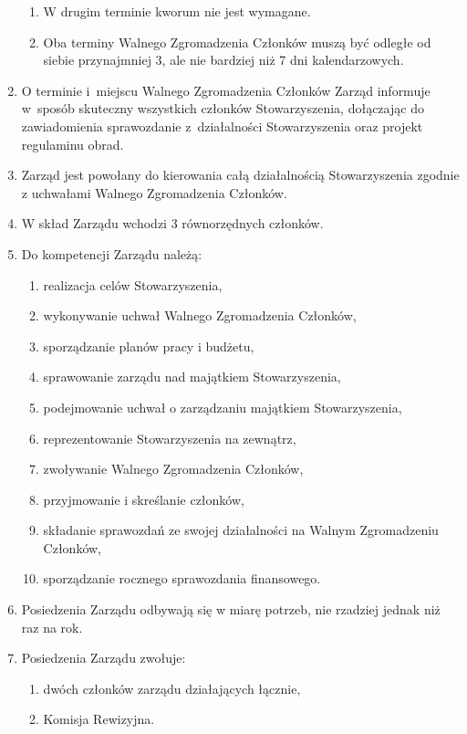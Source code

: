\documentclass{article}
\begin{document}
\begin{enumerate}
\begin{enumerate}
        \item W drugim terminie kworum nie jest wymagane.
        \item Oba terminy Walnego Zgromadzenia Członków muszą być odległe od siebie przynajmniej 3, ale nie bardziej niż 7 dni kalendarzowych.
      \end{enumerate}
    \item O terminie i~miejscu Walnego Zgromadzenia Członków Zarząd informuje w~sposób skuteczny wszystkich członków Stowarzyszenia, dołączając do zawiadomienia sprawozdanie z~działalności Stowarzyszenia oraz projekt regulaminu obrad.
    \item Zarząd jest powołany do kierowania całą działalnością Stowarzyszenia zgodnie z uchwałami Walnego Zgromadzenia Członków.
    \item W skład Zarządu wchodzi 3 równorzędnych członków.
    \item Do kompetencji Zarządu należą:
      \begin{enumerate}
        \item realizacja celów Stowarzyszenia,
        \item wykonywanie uchwał Walnego Zgromadzenia Członków,
        \item sporządzanie planów pracy i budżetu,
        \item sprawowanie zarządu nad majątkiem Stowarzyszenia,
        \item podejmowanie uchwał o zarządzaniu majątkiem Stowarzyszenia,
        \item reprezentowanie Stowarzyszenia na zewnątrz,
        \item zwoływanie Walnego Zgromadzenia Członków,
        \item przyjmowanie i skreślanie członków,
        \item składanie sprawozdań ze swojej działalności na Walnym Zgromadzeniu Członków,
        \item sporządzanie rocznego sprawozdania finansowego.
      \end{enumerate}
    \item Posiedzenia Zarządu odbywają się w miarę potrzeb, nie rzadziej jednak niż raz na rok.
    \item Posiedzenia Zarządu zwołuje:
      \begin{enumerate}
        \item dwóch członków zarządu działających łącznie,
        \item Komisja Rewizyjna.
      \end{enumerate}

\end{enumerate}
\end{document}
